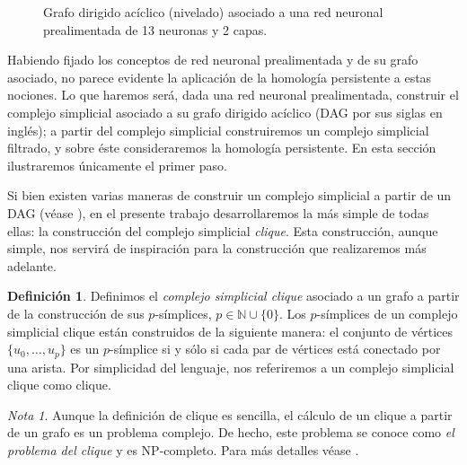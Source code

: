 \documentclass[12pt, a4paper, twoside]{book}
\numberwithin{equation}{section}
\theoremstyle{definition}
\newtheorem{defi}{Definición}[section]
\newenvironment{ejem}
  {\pushQED{\qed}\renewcommand{\qedsymbol}{$\blacktriangleleft$}\ejemplo}
  {\popQED\endejemplo}
\theoremstyle{remark}
\newtheorem*{remark}{Nota}
\theoremstyle{plain}
\begin{document}
\begin{ejem}
\begin{figure}[!htbp]
			\caption{Grafo dirigido acíclico (nivelado) asociado a 
			una red neuronal prealimentada de 13 neuronas y 2 capas.}
			\label{fig:redEjem}
		\end{figure}
	\end{ejem}

	Habiendo fijado los conceptos de red neuronal prealimentada y de su 
	grafo asociado, no parece evidente la aplicación de la homología 
	persistente a estas nociones. Lo que haremos será, dada una red 
	neuronal prealimentada, construir el complejo simplicial asociado a su
	grafo dirigido acíclico (DAG por sus siglas en inglés); a partir del 
	complejo simplicial construiremos un complejo simplicial filtrado, y 
	sobre éste consideraremos la homología persistente. En esta sección
	ilustraremos únicamente el primer paso.

	Si bien existen varias maneras de construir un complejo simplicial a 
	partir de un DAG (véase \cite{Clique-Jakob}), en el presente trabajo 
	desarrollaremos la más simple
	de todas ellas: la construcción del complejo simplicial \emph{clique}. 
	Esta construcción, aunque simple, nos servirá de inspiración para la 
	construcción que realizaremos más adelante. 
	
	\begin{defi}
		Definimos el \textit{complejo simplicial clique} asociado a un
		grafo a partir de la construcción de sus $p$-símplices, $p \in 
		\mathbb{N}\cup\{0\}$. Los $p$-símplices de un complejo 
		simplicial clique están construidos de la siguiente manera: el 
		conjunto de vértices $\{u_{0},\dots,u_{p}\}$ es un 
		$p$-símplice si y sólo si cada par de vértices está conectado 
		por una arista. Por simplicidad del lenguaje, nos referiremos
		a un complejo simplicial clique como clique.
	\end{defi}

	\begin{remark}
		Aunque la definición de clique es sencilla, el cálculo de un 
		clique a partir de un grafo es un problema complejo. De hecho,
		este problema se conoce como \emph{el problema del clique} y 
		es NP-completo. Para más detalles véase \cite{NP-Karp}.
	\end{remark}
\end{document}
